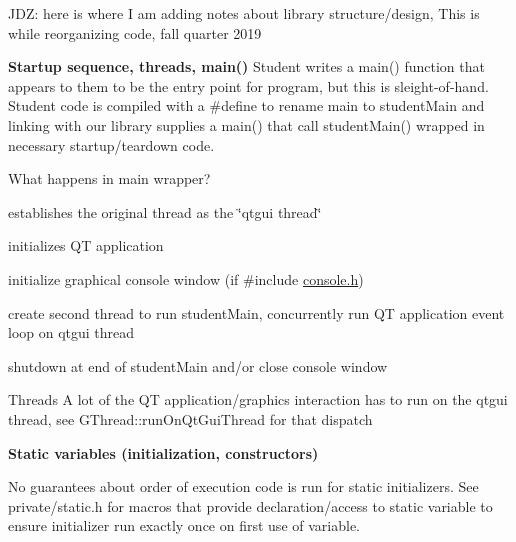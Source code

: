 J\+DZ\+: here is where I am adding notes about library structure/design, This is while reorganizing code, fall quarter 2019

{\bfseries Startup sequence, threads, main()} Student writes a main() function that appears to them to be the entry point for program, but this is sleight-\/of-\/hand. Student code is compiled with a \#define to rename main to student\+Main and linking with our library supplies a main() that call student\+Main() wrapped in necessary startup/teardown code.
\begin{DoxyItemize}
\item What happens in main wrapper?
\begin{DoxyEnumerate}
\item establishes the original thread as the \char`\"{}qtgui thread\char`\"{}
\item initializes QT application
\item initialize graphical console window (if \#include \mbox{\hyperlink{console_8h_source}{console.\+h}})
\item create second thread to run student\+Main, concurrently run QT application event loop on qtgui thread
\item shutdown at end of student\+Main and/or close console window
\end{DoxyEnumerate}
\item Threads A lot of the QT application/graphics interaction has to run on the qtgui thread, see G\+Thread\+::run\+On\+Qt\+Gui\+Thread for that dispatch
\end{DoxyItemize}

{\bfseries Static variables (initialization, constructors)}
\begin{DoxyItemize}
\item No guarantees about order of execution code is run for static initializers. See private/static.\+h for macros that provide declaration/access to static variable to ensure initializer run exactly once on first use of variable. 
\end{DoxyItemize}